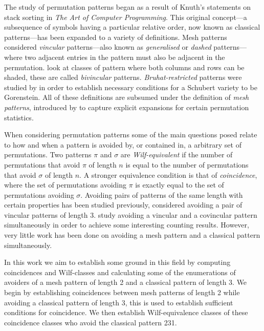 The study of permutation patterns began as a result of Knuth's statements on stack sorting in
\emph{The Art of Computer Programming}\cite[p.~243, Ex.~5,6]{Knuth:1997:ACP:260999}. This original
concept---a subsequence of symbols having a particular relative order, now known as classical
patterns---has been expanded to a variety of definitions. Mesh patterns \textcite{babstein2000} 
considered \emph{vincular} patterns---also known as \emph{generalised} or \emph{dashed} 
patterns---where two adjacent entries in the pattern must also be adjacent in the permutation. 
\textcite{MR2652101} look at classes of pattern where both columns and rows can be shaded, these are
called \emph{bivincular} patterns. \emph{Bruhat-restricted} patterns were studied by 
\textcite{MR2264071} in order to establish necessary conditions for a Schubert variety to be
Gorenstein. All of these definitions are subsumed under the definition of \emph{mesh patterns},
introduced by \textcite{journals/combinatorics/BrandenC11} to capture explicit expansions for 
certain permutation statistics.

When considering permutation patterns some of the main questions posed relate to how and when a
pattern is avoided by, or contained in, a arbitrary set of permutations. Two patterns \(\pi\) and
\(\sigma\) are \emph{Wilf-equivalent} if the number of permutations that avoid \(\pi\) of length 
\(n\) is equal to the number of permutations that avoid \(\sigma\) of length \(n\). A stronger 
equivalence condition is that of \emph{coincidence}, where the set of permutations avoiding \(\pi\)
is exactly equal to the set of permutations avoiding \(\sigma\). Avoiding pairs of patterns of the
same length with certain properties has been studied previously, \textcite{MR2178749} considered 
avoiding a pair of vincular patterns of length 3. \textcite{2015arXiv151203226B} study avoiding a 
vincular and a covincular pattern simultaneously in order to achieve some interesting counting 
results. However, very little work has been done on avoiding a mesh pattern and a classical pattern 
simultaneously. 

In this work we aim to establish some ground in this field by computing coincidences
and Wilf-classes and calculating some of the enumerations of avoiders of a mesh pattern of length
2 and a classical pattern of length 3. We begin by establishing coincidences between mesh patterns
of length 2 while avoiding a classical pattern of length 3, this is used to establish sufficient
conditions for coincidence. We then establish Wilf-equivalence classes of these coincidence classes
who avoid the classical pattern 231.